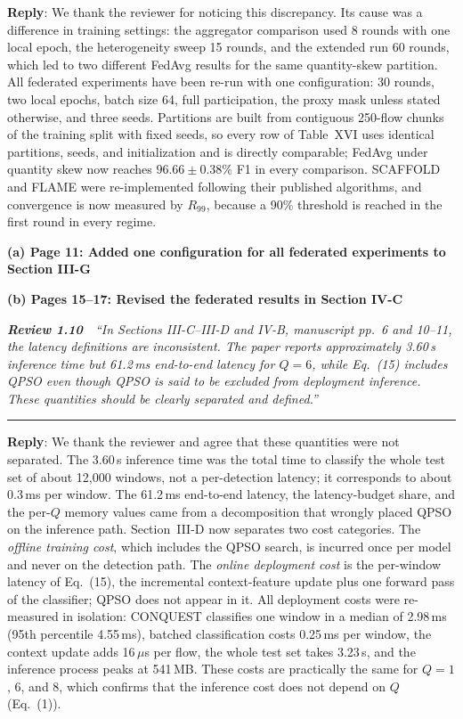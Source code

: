 \documentclass[11pt]{article}
\newcommand{\review}[2]{\par\bigskip\noindent\textbf{\textit{Review #1}}\ \ \textit{``#2''}\par\smallskip\hrule\medskip}
\newcommand{\reply}{\noindent\textbf{Reply}: }
\newcommand{\loc}[1]{\par\medskip\noindent\textbf{#1}\par}
\begin{document}
\reply We thank the reviewer for noticing this discrepancy. Its cause was a
difference in training settings: the aggregator comparison used 8 rounds
with one local epoch, the heterogeneity sweep 15 rounds, and the extended run
60 rounds, which led to two different FedAvg results for the same quantity-skew
partition. All federated experiments have been re-run with one configuration:
30 rounds, two local epochs, batch size 64, full participation, the proxy mask
unless stated otherwise, and three seeds. Partitions are built from
contiguous 250-flow chunks of the training split with fixed seeds, so every
row of Table~XVI uses identical partitions, seeds, and initialization and is
directly comparable; FedAvg under quantity skew now reaches
$96.66\pm0.38\%$ F1 in every comparison. SCAFFOLD and FLAME were
re-implemented following their published algorithms, and convergence is now
measured by $R_{99}$, because a 90\% threshold is reached in the first round
in every regime.

\loc{(a) Page 11: Added one configuration for all federated experiments to Section III-G}

\loc{(b) Pages 15--17: Revised the federated results in Section IV-C}

\review{1.10}{In Sections III-C--III-D and IV-B, manuscript pp.~6 and 10--11, the latency definitions are inconsistent. The paper reports approximately 3.60\,s inference time but 61.2\,ms end-to-end latency for $Q=6$, while Eq.~(15) includes QPSO even though QPSO is said to be excluded from deployment inference. These quantities should be clearly separated and defined.}

\reply We thank the reviewer and agree that these quantities were not
separated. The 3.60\,s inference time was the total time to classify the
whole test set of about 12{,}000 windows, not a per-detection latency; it
corresponds to about 0.3\,ms per window. The 61.2\,ms end-to-end latency, the
latency-budget share, and the per-$Q$ memory values came from a decomposition
that wrongly placed QPSO on the inference path. Section~III-D now separates
two cost categories. The \textit{offline training cost}, which includes the
QPSO search, is incurred once per model and never on the detection path. The
\textit{online deployment cost} is the per-window latency of Eq.~(15), the
incremental context-feature update plus one forward pass of the classifier;
QPSO does not appear in it. All deployment costs were re-measured in
isolation: CONQUEST classifies one window in a median of 2.98\,ms (95th
percentile 4.55\,ms), batched classification costs 0.25\,ms per window, the
context update adds 16\,$\mu$s per flow, the whole test set takes 3.23\,s, and
the inference process peaks at 541\,MB. These costs are practically the same
for $Q=1$, 6, and 8, which confirms that the inference cost does not depend
on $Q$ (Eq.~(1)).
\end{document}
